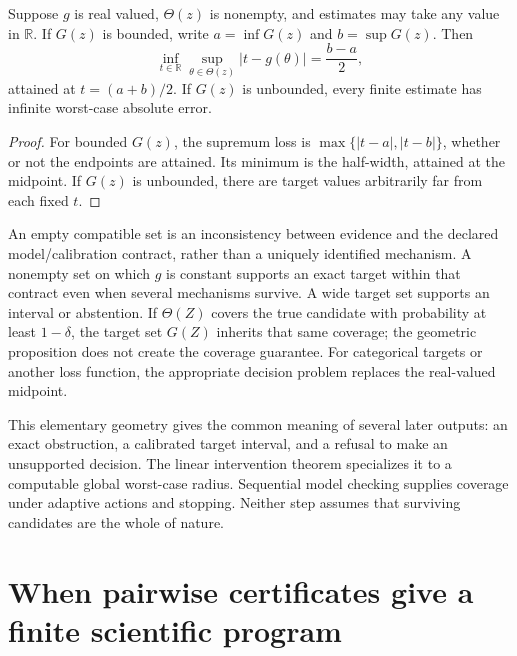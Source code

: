 \begin{proposition}\label{foundations:radius}
Suppose $g$ is real valued, $\Theta(z)$ is nonempty, and estimates may take
any value in $\mathbb R$. If $G(z)$ is bounded, write
$a=\inf G(z)$ and $b=\sup G(z)$. Then
\begin{equation}
 \inf_{t\in\mathbb R}\sup_{\theta\in\Theta(z)}|t-g(\theta)|
 =\frac{b-a}{2},
\end{equation}
attained at $t=(a+b)/2$. If $G(z)$ is unbounded, every finite estimate has
infinite worst-case absolute error.
\end{proposition}
\begin{proof}
For bounded $G(z)$, the supremum loss is
$\max\{|t-a|,|t-b|\}$, whether or not the endpoints are attained. Its
minimum is the half-width, attained at the midpoint. If $G(z)$ is unbounded,
there are target values arbitrarily far from each fixed $t$.
\end{proof}

An empty compatible set is an inconsistency between evidence and the
declared model/calibration contract, rather than a uniquely identified
mechanism. A nonempty set on which $g$ is constant supports an exact target
within that contract even when several mechanisms survive. A wide target
set supports an interval or abstention. If $\Theta(Z)$ covers the true
candidate with probability at least $1-\delta$, the target set $G(Z)$
inherits that same coverage; the geometric proposition does not create the
coverage guarantee. For categorical targets or another loss function, the
appropriate decision problem replaces the real-valued midpoint.

This elementary geometry gives the common meaning of several later outputs:
an exact obstruction, a calibrated target interval, and a refusal to make an
unsupported decision. The linear intervention theorem specializes it to a
computable global worst-case radius. Sequential model checking supplies
coverage under adaptive actions and stopping. Neither step assumes that
surviving candidates are the whole of nature.

\section{When pairwise certificates give a finite scientific program}


